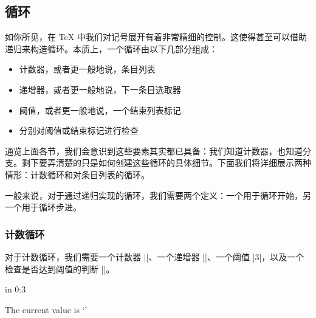 \documentclass[a4paper,doc2]{ltxdoc}
\begin{document}
\subsection{循环}
\label{sec:loops}
如你所见，在 \TeX{} 中我们对记号展开有着非常精细的控制。这使得甚至可以借助递归来构造循环。本质上，一个循环由以下几部分组成：
\begin{itemize}
 \item 计数器，或者更一般地说，条目列表
 \item 递增器，或者更一般地说，下一条目选取器
 \item 阈值，或者更一般地说，一个结束列表标记
 \item 分别对阈值或结束标记进行检查
\end{itemize}

通览上面各节，我们会意识到这些要素其实都已具备：我们知道计数器，也知道分支。剩下要弄清楚的只是如何创建这些循环的具体细节。下面我们将详细展示两种情形：计数循环和对条目列表的循环。

一般来说，对于通过递归实现的循环，我们需要两个定义：一个用于循环开始，另一个用于循环步进。

\subsubsection{计数循环}
\label{sec:counting:loops}
对于计数循环，我们需要一个计数器 ||、一个递增器 |\advance|、一个阈值 |3|，以及一个检查是否达到阈值的判断 |\ifnum{}|。


\begin{codeexample}[]
\long{}

\long{}
 in 0:{3}{%
	The current value is `\the{}'\par
}
\end{codeexample}
\end{document}
